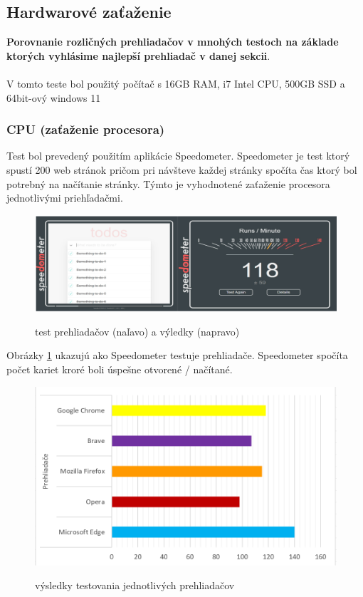 \documentclass[10pt,Slovak,a4paper]{article}
\begin{document}
    \subsection{Hardwarové zaťaženie}
    \begin{paragraph}
    
        \textbf{Porovnanie rozličných prehliadačov v mnohých testoch na     základe ktorých vyhlásime najlepší prehliadač v danej sekcii}. \\\\
            V tomto teste bol použitý počítač s 16GB RAM, i7 Intel CPU, 500GB SSD a 64bit-ový windows 11 
            \subsubsection{CPU (zaťaženie procesora)}
            Test bol prevedený použitím aplikácie Speedometer. Speedometer je test ktorý spustí 200 web stránok pričom pri návšteve každej stránky spočíta čas ktorý bol potrebný na načítanie stránky. Týmto je vyhodnotené zaťaženie procesora jednotlivými priehľadačmi.
        \begin{figure}[h]
            \centering
            \includegraphics[scale=.60]{speedometer.png}
            \cite{img2}
            \caption{test prehliadačov (naľavo) a výledky (napravo)}
            \label{fig1}
        \end{figure}    
        
        Obrázky \ref{fig1} ukazujú ako Speedometer testuje prehliadače. Speedometer spočíta počet kariet kroré boli úspešne otvorené / načítané. \\

        \begin{figure}[h]
            \centering
            \includegraphics[scale=.8]{graph1.png}
            \cite{graph1}
            \caption{výsledky testovania jednotlivých prehliadačov}
            \label{graph1}
        \end{figure}   


\end{paragraph}
\end{document}
